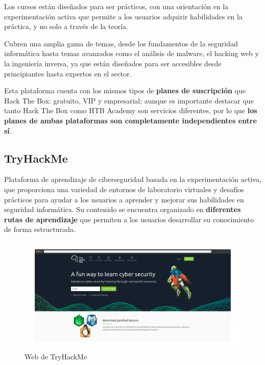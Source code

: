             Los cursos están diseñados para ser prácticos, con una orientación en la experimentación activa que permite a los usuarios adquirir habilidades en la práctica, y no solo a través de la teoría.
            
            Cubren una amplia gama de temas, desde los fundamentos de la seguridad informática hasta temas avanzados como el análisis de malware, el hacking web y la ingeniería inversa, ya que están diseñados para ser accesibles desde principiantes hasta expertos en el sector.
            
            Esta plataforma cuenta con los mismos tipos de \textbf{planes de suscripción} que Hack The Box: gratuito, VIP y empresarial; aunque es importante destacar que tanto Hack The Box como HTB Academy son servicios diferentes, por lo que \textbf{los planes de ambas plataformas son completamente independientes entre sí}.
            
            \newpage
        
        
        \subsection{TryHackMe}
        
            Plataforma de aprendizaje de ciberseguridad basada en la experimentación activa, que proporciona una variedad de entornos de laboratorio virtuales y desafíos prácticos para ayudar a los usuarios a aprender y mejorar sus habilidades en seguridad informática. Su contenido se encuentra organizado en \textbf{diferentes rutas de aprendizaje} que permiten a los usuarios desarrollar su conocimiento de forma estructurada.
            
            \begin{figure}[h]
                \centering

                \includegraphics[width=\textwidth]{images/Capturas/Web de THM.png}

                \caption{Web de TryHackMe}
                \label{fig:THM-web}
            \end{figure}
            
